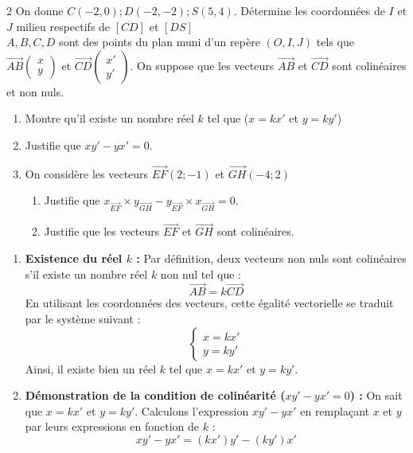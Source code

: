 \begin{multicols*}{2}
  	 On donne $C(-2, 0); D(-2, -2); S(5, 4)$. Détermine les coordonnées de $I$ et $J$ milieu respectifs de $[CD]$ et $[DS]$\\
  	$A, B, C, D$ sont des points du plan muni d'un repère $(O, I, J)$ tels que $\overrightarrow{AB}\begin{pmatrix} x \\ y \end{pmatrix}$ et $\overrightarrow{CD}\begin{pmatrix} x' \\ y' \end{pmatrix}$. On suppose que les vecteurs $\overrightarrow{AB}$ et $\overrightarrow{CD}$ sont colinéaires et non nuls.
  	\begin{enumerate}
  		\item Montre qu'il existe un nombre réel $k$ tel que ($x = kx'$ et $y = ky'$)
  		\item Justifie que  $xy' - yx' = 0$.
  		\item On considère les vecteurs $ \overrightarrow{EF}(2;-1) $ et $ \overrightarrow{GH}(-4;2) $
  		\begin{enumerate}
  			\item Justifie que $ x_{\overrightarrow{EF}}\times y_{\overrightarrow{GH}}-y_{\overrightarrow{EF}}\times x_{\overrightarrow{GH}}=0 $.
  			\item  Justifie que les vecteurs $ \overrightarrow{EF} $ et $ \overrightarrow{GH} $ sont colinéaires.
  		\end{enumerate}
  	\end{enumerate}
  	\dure 
  	\resul
  	\begin{enumerate}
  		\item \textbf{Existence du réel $k$ :}
  		Par définition, deux vecteurs non nuls sont colinéaires s'il existe un nombre réel $k$ non nul tel que :
  		\[ \overrightarrow{AB} = k\overrightarrow{CD} \]
  		En utilisant les coordonnées des vecteurs, cette égalité vectorielle se traduit par le système suivant :
  		\[ \begin{cases} x = kx' \\ y = ky' \end{cases} \]
  		Ainsi, il existe bien un réel $k$ tel que $x = kx'$ et $y = ky'$.
  		
  		\item \textbf{Démonstration de la condition de colinéarité ($xy' - yx' = 0$) :}
  		On sait que $x = kx'$ et $y = ky'$. Calculons l'expression $xy' - yx'$ en remplaçant $x$ et $y$ par leurs expressions en fonction de $k$ :
  		\[ xy' - yx' = (kx')y' - (ky')x' \]
  		

\end{enumerate}
\end{multicols*}
